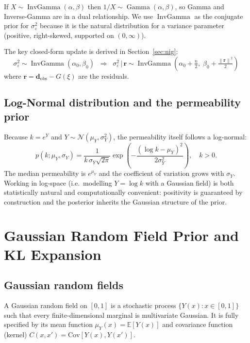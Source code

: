 \documentclass[11pt, a4paper]{article}
\newcommand{\N}{\mathcal{N}}
\newcommand{\E}{\mathbb{E}}
\newcommand{\IG}{\operatorname{InvGamma}}
\newcommand{\Ga}{\operatorname{Gamma}}
\newcommand{\norm}[1]{\left\|#1\right\|}
\theoremstyle{definition}
\begin{document}
If $X\sim\IG(\alpha,\beta)$ then $1/X\sim\Ga(\alpha,\beta)$, so Gamma and
Inverse-Gamma are in a dual relationship.  We use $\IG$ as the conjugate
prior for $\sigma_\varepsilon^2$ because it is the natural distribution for
a variance parameter (positive, right-skewed, supported on $(0,\infty)$).

The key closed-form update is derived in Section~\ref{sec:nig}:
\begin{equation}
  \sigma_\varepsilon^2\sim\IG(\alpha_0,\beta_0)
  \;\;\Longrightarrow\;\;
  \sigma_\varepsilon^2\,|\,\mathbf{r}\sim
  \IG\!\left(\alpha_0+\tfrac{n}{2},\;\beta_0+\tfrac{\norm{\mathbf{r}}^2}{2}\right)
  \label{eq:ig_update}
\end{equation}
where $\mathbf{r}=\mathbf{d}_{\mathrm{obs}}-G(\xi)$ are the residuals.

\subsection{Log-Normal distribution and the permeability prior}

Because $k=e^Y$ and $Y\sim\N(\mu_Y,\sigma_Y^2)$, the permeability itself
follows a log-normal:
\[
  p(k;\mu_Y,\sigma_Y)
  = \frac{1}{k\,\sigma_Y\sqrt{2\pi}}
    \exp\!\left(-\frac{(\log k - \mu_Y)^2}{2\sigma_Y^2}\right),
  \quad k>0.
\]
The median permeability is $e^{\mu_Y}$ and the coefficient of variation
grows with $\sigma_Y$.  Working in log-space (i.e.\ modelling $Y=\log k$
with a Gaussian field) is both statistically natural and computationally
convenient: positivity is guaranteed by construction and the posterior
inherits the Gaussian structure of the prior.

\section{Gaussian Random Field Prior and KL Expansion}
\label{sec:kl}

\subsection{Gaussian random fields}

A Gaussian random field on $[0,1]$ is a stochastic process
$\{Y(x):x\in[0,1]\}$ such that every finite-dimensional marginal is
multivariate Gaussian.  It is fully specified by its mean function
$\mu_Y(x)=\E[Y(x)]$ and covariance function (kernel)
$C(x,x')=\mathrm{Cov}[Y(x),Y(x')]$.
\end{document}

